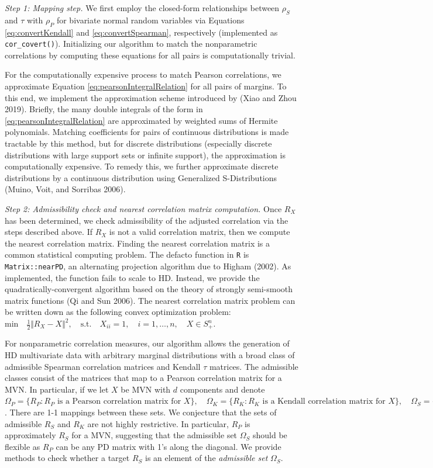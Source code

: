 \documentclass{article}
\begin{document}
\emph{Step 1: Mapping step.} We first employ the closed-form
relationships between \(\rho_S\) and \(\tau\) with \(\rho_P\) for
bivariate normal random variables via Equations \ref{eq:convertKendall}
and \ref{eq:convertSpearman}, respectively (implemented as
\texttt{cor\_covert()}). Initializing our algorithm to match the
nonparametric correlations by computing these equations for all pairs is
computationally trivial.

For the computationally expensive process to match Pearson correlations,
we approximate Equation \ref{eq:pearsonIntegralRelation} for all pairs
of margins. To this end, we implement the approximation scheme
introduced by (Xiao and Zhou 2019). Briefly, the many double integrals
of the form in \ref{eq:pearsonIntegralRelation} are approximated by
weighted sums of Hermite polynomials. Matching coefficients for pairs of
continuous distributions is made tractable by this method, but for
discrete distributions (especially discrete distributions with large
support sets or infinite support), the approximation is computationally
expensive. To remedy this, we further approximate discrete distributions
by a continuous distribution using Generalized S-Distributions (Muino,
Voit, and Sorribas 2006).

\emph{Step 2: Admissibility check and nearest correlation matrix
computation.} Once \(R_X\) has been determined, we check admissibility
of the adjusted correlation via the steps described above. If \(R_X\) is
not a valid correlation matrix, then we compute the nearest correlation
matrix. Finding the nearest correlation matrix is a common statistical
computing problem. The defacto function in \texttt{R} is
\texttt{Matrix::nearPD}, an alternating projection algorithm due to
Higham (2002). As implemented, the function fails to scale to HD.
Instead, we provide the quadratically-convergent algorithm based on the
theory of strongly semi-smooth matrix functions (Qi and Sun 2006). The
nearest correlation matrix problem can be written down as the following
convex optimization problem:
\(\mathrm{min} \quad \frac{1}{2} \Vert R_X - X \Vert^2, \quad \mathrm{s.t.} \quad X_{ii} = 1, \quad i = 1, \ldots , n, \quad X \in S_{+}^{n}\).

For nonparametric correlation measures, our algorithm allows the
generation of HD multivariate data with arbitrary marginal distributions
with a broad class of admissible Spearman correlation matrices and
Kendall \(\tau\) matrices. The admissible classes consist of the
matrices that map to a Pearson correlation matrix for a MVN. In
particular, if we let \(X\) be MVN with \(d\) components and denote
\(\Omega_P = \{ R_P : R_P \textrm{ is a Pearson correlation matrix for } X \}, \quad \Omega_K = \{ R_K : R_K \textrm{ is a Kendall correlation matrix for } X \}, \quad \Omega_S = \{ R_S : R_S \textrm{ is a Spearman correlation matrix for } X \}\).
There are 1-1 mappings between these sets. We conjecture that the sets
of admissible \(R_S\) and \(R_K\) are not highly restrictive. In
particular, \(R_P\) is approximately \(R_S\) for a MVN, suggesting that
the admissible set \(\Omega_S\) should be flexible as \(R_P\) can be any
PD matrix with 1's along the diagonal. We provide methods to check
whether a target \(R_S\) is an element of the \emph{admissible set}
\(\Omega_S\).
\end{document}
